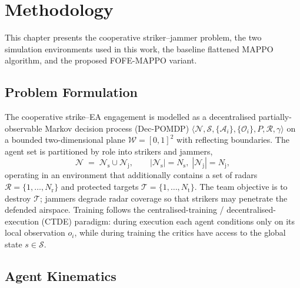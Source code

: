 \chapter{Methodology}
\label{ch:methodology}

This chapter presents the cooperative striker--jammer problem, the two
simulation environments used in this work, the baseline flattened MAPPO
algorithm, and the proposed FOFE-MAPPO variant. 

\section{Problem Formulation}
\label{sec:problem}

The cooperative strike--EA engagement is modelled as a decentralised
partially-observable Markov decision process (Dec-POMDP)
$\langle \mathcal{N}, \mathcal{S}, \{\mathcal{A}_i\},
\{\mathcal{O}_i\}, P, \mathcal{R}, \gamma\rangle$ on a bounded two-dimensional
plane $\mathcal{W}=[0,1]^2$ with reflecting boundaries. The agent set is
partitioned by role into strikers and jammers,
\begin{equation}
\mathcal{N} \;=\; \mathcal{N}_{\mathrm{s}} \cup \mathcal{N}_{\mathrm{j}},
\qquad
|\mathcal{N}_{\mathrm{s}}|=N_{\mathrm{s}},\;
|\mathcal{N}_{\mathrm{j}}|=N_{\mathrm{j}},
\end{equation}
operating in an environment that additionally contains a set of radars
$\mathcal{R}=\{1,\dots,N_{\mathrm{r}}\}$ and protected targets
$\mathcal{T}=\{1,\dots,N_{\mathrm{t}}\}$. The team objective is to destroy
$\mathcal{T}$; jammers degrade radar coverage so that strikers may penetrate
the defended airspace. Training follows the centralised-training /
decentralised-execution (CTDE) paradigm: during execution each agent conditions
only on its local observation $o_i$, while during training the critics have
access to the global state $s\in\mathcal{S}$.

\section{Agent Kinematics}
\label{sec:kinematics}

